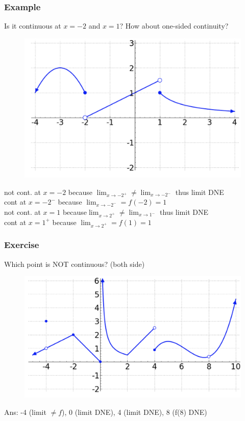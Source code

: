 \documentclass[t]{beamer}
\theoremstyle{plain}
\theoremstyle{definition}
\newcommand{\limm}[1]{\displaystyle \lim_{x\to #1}}
\begin{document}
\begin{frame}
\frametitle{Example}

Is it continuous at $x=-2$ and $x=1$?  How about one-sided continuity?
	\begin{figure}[l]
	\includegraphics[scale=.25]{fig/con1}
	\label{fig}
	\end{figure}	
	
not cont. at $x = -2$ because $\limm{-2^+} \neq \limm{-2^-}$ thus limit DNE\\
cont at $x = -2^-$ because $\limm{-2^-} = f(-2) = 1$\\

not cont. at $x = 1$ because$\limm{2^+} \neq \limm{1^-}$ thus limit DNE\\
 cont at $x = 1^+$ because $\limm{2^+} = f(1) = 1$\\

\end{frame}

\begin{frame}
\frametitle{Exercise}
Which point is NOT continuous?  (both side)
	\begin{figure}[l]
	\includegraphics[scale=.4]{fig/con2}
	\label{fig}
	\end{figure}	
	\pause
Ans: -4 (limit $\neq f$), 0 (limit DNE), 4 (limit DNE), 8 (f(8) DNE)
\end{frame}
\end{document}
